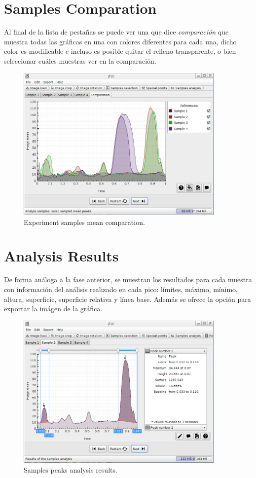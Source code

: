 \section{Samples Comparation}
Al final de la lista de pesta\~nas se puede ver una que dice \emph{comparaci\'on} que muestra todas las gr\'aficas en una con colores diferentes para cada una, dicho color es modificable e incluso es posible quitar el relleno transparente, o bien seleccionar cu\'ales muestras ver en la comparaci\'on.
\begin{figure}[H]
	\vspace{0cm}
	\centering
	\includegraphics[width=385px]{imagenes/comparation}
	\centering
	\vspace{-0.4cm}
	\caption{Experiment samples mean comparation.}
	\label{fig:image_samples_comparation}
	\vspace{-0.25cm}
\end{figure}

\section{Analysis Results}
De forma an\'aloga a la fase anterior, se muestran los resultados para cada muestra con informaci\'on del an\'alisis realizado en cada pico: l\'imites, m\'aximo, m\'inimo, altura, superficie, superficie relativa y l\'inea  base. Adem\'as se ofrece la opci\'on para exportar la im\'agen de la gr\'afica.
\begin{figure}[H]
	\vspace{0cm}
	\centering
	\includegraphics[width=385px]{imagenes/peaks}
	\centering
	\vspace{-0.4cm}
	\caption{Samples peaks analysis results.}
	\label{fig:image_analysis_results}
	\vspace{-0.25cm}
\end{figure}

